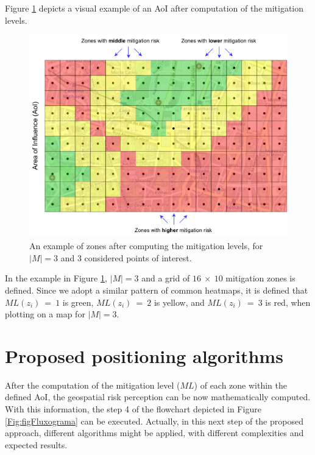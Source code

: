 \begin{refsection}
Figure \ref{Fig:figGrid2} depicts a visual example of an AoI after computation of the mitigation levels. 


\begin{figure}[htbp!]
  \centering
  \includegraphics[width=0.77\linewidth]{Chapters/2-EDUs/images/MitigationZonesColors.pdf}
  \caption{An example of zones after computing the mitigation levels, for $|M|=3$ and 3 considered points of interest.}\label{Fig:figGrid2}
\end{figure}

In the example in Figure \ref{Fig:figGrid2}, $|M|=3$ and a grid of $16~\times~10$ mitigation zones is defined. Since we adopt a similar pattern of common heatmaps, it is defined that $ML(z_i)~=~1$ is green, $ML(z_i)~=~2$ is yellow, and $ML(z_i)~=~3$ is red, when plotting on a map for $|M|=3$.


\section{Proposed positioning algorithms}\label{S:4}

After the computation of the mitigation level ($ML$) of each zone within the defined AoI, the geospatial risk perception can be now mathematically computed. With this information, the step 4 of the flowchart depicted in Figure \ref{Fig:figFluxograma} can be executed. Actually, in this next step of the proposed approach, different algorithms might be applied, with different complexities and expected results. 


\end{refsection}
